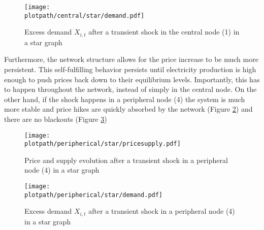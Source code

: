 \begin{figure}[H]
  \centering
  \texttt{[image: \\plotpath/central/star/demand.pdf]}
  \caption{Excess demand $X_{i, t}$ after a transient shock in the central node (1) in a star graph} \label{fig:demandtransshockcen_star}
\end{figure}

Furthermore, the network structure allows for the price increase to be much more persistent. This self-fulfilling behavior persists until electricity production is high enough to push prices back down to their equilibrium levels. Importantly, this has to happen throughout the network, instead of simply in the central node. On the other hand, if the shock happens in a peripheral node (4) the system is much more stable and price hikes are quickly absorbed by the network (Figure \ref{fig:transshockper_star}) and there are no blackouts (Figure \ref{fig:demandtransshockper_star})

\begin{figure}[H]
  \centering
  \texttt{[image: \\plotpath/peripherical/star/pricesupply.pdf]}
  \caption{Price and supply evolution after a transient shock in a peripheral node (4) in a star graph} \label{fig:transshockper_star}
\end{figure}

\begin{figure}[H]
  \centering
  \texttt{[image: \\plotpath/peripherical/star/demand.pdf]}
  \caption{Excess demand $X_{i, t}$ after a transient shock in a peripheral node (4) in a star graph} \label{fig:demandtransshockper_star}
\end{figure}


